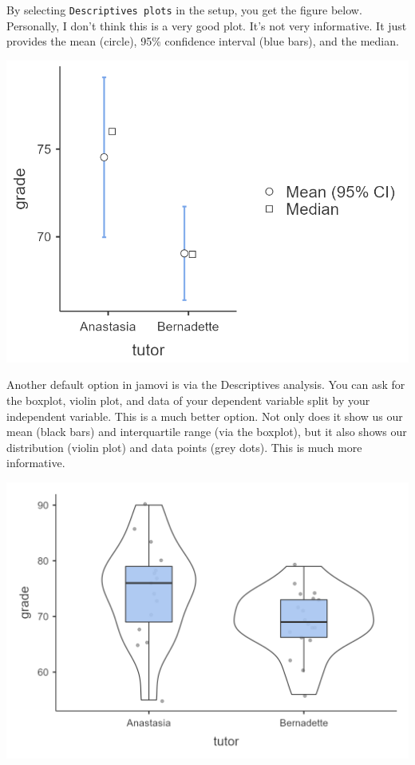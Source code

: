 \documentclass[
]{book}
\begin{document}
By selecting \texttt{Descriptives\ plots} in the setup, you get the figure below. Personally, I don't think this is a very good plot. It's not very informative. It just provides the mean (circle), 95\% confidence interval (blue bars), and the median.

\includegraphics{images/02-independent_t-test/independent_t-test_plot2.png}

Another default option in jamovi is via the Descriptives analysis. You can ask for the boxplot, violin plot, and data of your dependent variable split by your independent variable. This is a much better option. Not only does it show us our mean (black bars) and interquartile range (via the boxplot), but it also shows our distribution (violin plot) and data points (grey dots). This is much more informative.

\includegraphics{images/02-independent_t-test/independent_t-test_plot.png}
\end{document}
